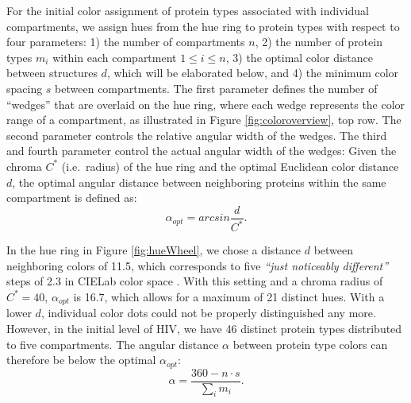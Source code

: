 \documentclass{egpubl}
\begin{document}
	For the initial color assignment of protein types associated with individual compartments, we assign hues from the hue ring to protein types with respect to four parameters: 
	1) the number of compartments $n$, 2) the number of protein types $m_i$ within each compartment $1 \leq i \leq n$, 3) the optimal color distance between structures $d$, which will be elaborated below, and 4) the minimum color spacing $s$ between compartments. 
	The first parameter defines the number of ``wedges'' that are overlaid on the hue ring, where each wedge represents the color range of a compartment, as illustrated in Figure \ref{fig:coloroverview}, top row. 
	The second parameter controls the relative angular width of the wedges. 
	The third and fourth parameter control the actual angular width of the wedges: 
	Given the chroma $C^*$ (i.e.\, radius) of the hue ring and the optimal Euclidean color distance $d$, the optimal angular distance between neighboring proteins within the same compartment is defined as: 
	\[
	\alpha_{opt} = arcsin\frac{d}{C^*}. 
	\]
	
	In the hue ring in Figure \ref{fig:hueWheel}, we chose a distance $d$ between neighboring colors of 11.5, which corresponds to five \textit{``just noticeably different''} steps of 2.3 in CIELab color space \cite{lee2013perceptually}. 
	With this setting and a chroma radius of $C^*=40$, $\alpha_{opt}$ is 16.7, which allows for a maximum of 21 distinct hues. 
	With a lower $d$, individual color dots could not be properly distinguished any more. 
	However, in the initial level of HIV, we have 46 distinct protein types distributed to five compartments. 
	The angular distance  $\alpha$ between protein type colors can therefore be below the optimal $\alpha_{opt}$: 
	\[
	\alpha= \frac{360  - n \cdot s}{\sum_{i} m_i}. 
	\]
	
\end{document}
